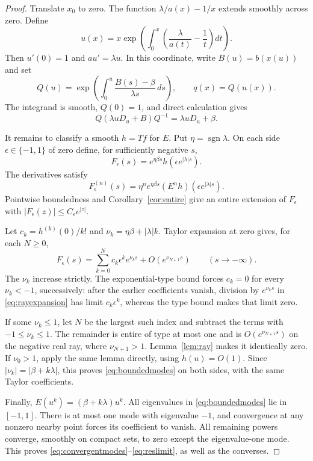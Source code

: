 \documentclass[11pt,reqno]{amsart}
\numberwithin{equation}{section}
\theoremstyle{definition}
\theoremstyle{remark}
\newcommand{\sgn}{\operatorname{sgn}}
\begin{document}
\begin{proof}
Translate $x_0$ to zero. The function $\lambda/a(x)-1/x$ extends smoothly across zero. Define
\[
 u(x)=x\exp\left(\int_0^x
        \left(\frac{\lambda}{a(t)}-\frac1t\right)dt\right).
\]
Then $u'(0)=1$ and $a u'=\lambda u$. In this coordinate, write $B(u)=b(x(u))$ and set
\[
 Q(u)=\exp\left(\int_0^u\frac{B(s)-\beta}{\lambda s}\,ds\right),
 \qquad q(x)=Q(u(x)).
\]
The integrand is smooth, $Q(0)=1$, and direct calculation gives
\[
 Q(\lambda uD_u+B)Q^{-1}=\lambda uD_u+\beta.
\]

It remains to classify a smooth $h=Tf$ for $E$. Put $\eta=\sgn\lambda$. On each side $\epsilon\in\{-1,1\}$ of zero define, for sufficiently negative $s$,
\[
 F_\epsilon(s)=e^{\eta\beta s}
                 h(\epsilon e^{|\lambda|s}).
\]
The derivatives satisfy
\[
 F_\epsilon^{(n)}(s)=\eta^n e^{\eta\beta s}
                   (E^nh)(\epsilon e^{|\lambda|s}).
\]
Pointwise boundedness and Corollary~\ref{cor:entire} give an entire extension of $F_\epsilon$ with $|F_\epsilon(z)|\le C_\epsilon e^{|z|}$.

Let $c_k=h^{(k)}(0)/k!$ and $\nu_k=\eta\beta+|\lambda|k$. Taylor expansion at zero gives, for each $N\ge0$,
\begin{equation}\label{eq:rayexpansion}
 F_\epsilon(s)=\sum_{k=0}^N c_k\epsilon^k e^{\nu_ks}
                    +O(e^{\nu_{N+1}s})
 \qquad(s\to-\infty).
\end{equation}
The $\nu_k$ increase strictly. The exponential-type bound forces $c_k=0$ for every $\nu_k<-1$, successively: after the earlier coefficients vanish, division by $e^{\nu_ks}$ in \eqref{eq:rayexpansion} has limit $c_k\epsilon^k$, whereas the type bound makes that limit zero.

If some $\nu_k\le1$, let $N$ be the largest such index and subtract the terms with $-1\le\nu_k\le1$. The remainder is entire of type at most one and is $O(e^{\nu_{N+1}s})$ on the negative real ray, where $\nu_{N+1}>1$. Lemma~\ref{lem:ray} makes it identically zero. If $\nu_0>1$, apply the same lemma directly, using $h(u)=O(1)$. Since $|\nu_k|=|\beta+k\lambda|$, this proves \eqref{eq:boundedmodes} on both sides, with the same Taylor coefficients.

Finally, $E(u^k)=(\beta+k\lambda)u^k$. All eigenvalues in \eqref{eq:boundedmodes} lie in $[-1,1]$. There is at most one mode with eigenvalue $-1$, and convergence at any nonzero nearby point forces its coefficient to vanish. All remaining powers converge, smoothly on compact sets, to zero except the eigenvalue-one mode. This proves \eqref{eq:convergentmodes}--\eqref{eq:reslimit}, as well as the converses.
\end{proof}
\end{document}
